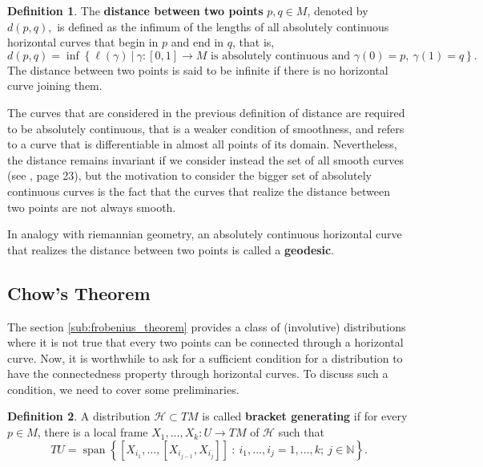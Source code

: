 \documentclass[12pt, letterpaper, reqno]{amsart}
\theoremstyle{definition}
\newtheorem{df}{Definition}
\theoremstyle{plain}
\theoremstyle{remark}
\begin{document}
\begin{df}
	The \textbf{distance between two points} $ p,q\in M $, denoted by $ d(p,q), $   is defined as the infimum of the lengths of all absolutely continuous horizontal curves that begin in $ p $ and end in $ q $, that is, 
$$ d(p,q) = \operatorname{inf} \left\{ \ell(\gamma) \ |\ \gamma:[0,1] \rightarrow {M} \text{ is absolutely continuous and }\gamma(0)=p, \ \gamma(1)=q \right\}. $$ 
The distance between two points is said to be infinite if there is no horizontal curve joining them.
\end{df}

The curves that are considered in the previous definition of distance are required to be absolutely continuous, that is a weaker condition of smoothness, and refers to a curve that is differentiable in almost all points of its domain. Nevertheless, the distance remains invariant if we consider instead the set of all smooth curves (see \cite{montgomery2002tour}, page 23), but the motivation to consider the bigger set of absolutely continuous curves is the fact that the curves that realize the distance between two points are not always smooth.

In analogy with riemannian geometry, an absolutely continuous horizontal curve that realizes the distance between two points is called a \textbf{geodesic}. 


\subsection{Chow's Theorem}%
\label{sub:chow_s_theorem}

The section \ref{sub:frobenius_theorem} provides a class of (involutive) distributions where it is not true that every two points can be connected through a horizontal curve.  Now, it is worthwhile to ask for a sufficient condition for a distribution to have the connectedness property through horizontal curves. To discuss such a condition, we need to cover some preliminaries. 

\begin{df}
	A distribution $ \mathcal{H}\subset TM $ is called \textbf{bracket generating} if for every $ p\in M $, there is a local frame $ X_1,\dots,X_k: U \rightarrow {TM} $ of $ \mathcal{H} $ such that 
	$$ TU = \operatorname{span}\left\{ [X_{i_1},\dots,[X_{i_{j-1}},X_{i_j}]]\ : \ i_1,\dots,i_j=1,\dots,k;\ j\in \mathbb{N} \right\}.  $$ 
\end{df}
\end{document}

